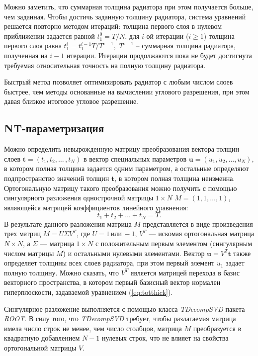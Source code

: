 \documentclass[12pt]{article}
\begin{document}
Можно заметить, что суммарная толщина радиатора при этом получается больше, чем заданная. Чтобы достичь заданную толщину радиатора, система уравнений решается повторно методом итераций: толщина первого слоя в нулевом приближении задается равной $t_1^0 = T/N$, 
для $i$-ой итерации ($i\geq 1$) толщина первого слоя равна $t_1^i=t_1^{i-1} T/T^{i-1},$ $T^{i-1}$ -- суммарная толщина радиатора, полученная на $i-1$ итерации. 
Итерации продолжаются пока не будет достигнута требуемая относительная точность на полную толщину радиатора.

Быстрый метод позволяет оптимизировать радиатор с любым числом слоев быстрее, чем методы основанные на вычислении углового разрешения, при этом давая близкое итоговое угловое разрешение.

\subsection{NT-параметризация}
\label{ss:ntpar}
Можно определить невырожденную матрицу преобразования вектора толщин слоев $\boldsymbol{t}=(t_1,t_2,\ldots\,,t_{N})$ в вектор 
специальных параметров $\boldsymbol{u}=(u_1,u_2,\ldots,u_{N})$, в котором полная толщина задается одним параметром, 
а остальные определяют подпространство значений толщин $\boldsymbol{t}$, в котором полная толщина неизменна. 
Ортогональную матрицу такого преобразования можно получить с помощью сингулярного 
разложения однострочной матрицы $1\times N$ $M=(1,1,\ldots,1)$, являющейся матрицей коэффициентов линейного уравнения:
\begin{equation}
t_1+t_2+\ldots+t_{N} = T.
\label{eq:totthick}
\end{equation}
В результате данного разложения матрица $M$ представляется в виде произведения трех матриц $M=U\Sigma V^T$, где $U=1\, \mathrm{или}\, -1$,
$V^T$ --- искомая ортогональная матрица $N\times N$, а $\Sigma$ --- матрица $1\times N$ с положительным первым элементом (сингулярным числом матрицы $M$) и остальными 
нулевыми элементами. Вектор $\boldsymbol{u} = V^T \boldsymbol{t}$ также определяет толщины всех слоев радиатора, при этом первый элемент $u_1$ задает полную толщину. 
Можно сказать, что $V^T$ является матрицей перехода в  базис векторного пространства, в котором первый базисный вектор нормален гиперплоскости, задаваемой уравнением (\ref{eq:totthick}).

Сингулярное разложение выполняется с помощью класса {\em TDecompSVD} пакета {\em ROOT}. В силу того, что {\em TDecompSVD} требует, чтобы разлагаемая матрица 
имела число строк не менее, чем число столбцов, матрица $M$ преобразуется в квадратную добавлением $N-1$ нулевых строк, что не влияет на свойства ортогональной матрицы $V$.
\end{document}
